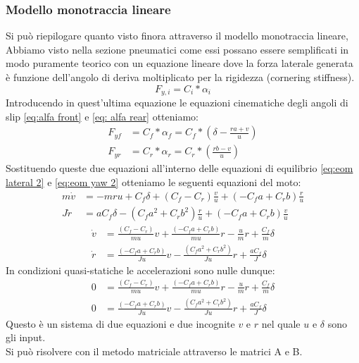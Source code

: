 \subsubsection{Modello monotraccia lineare}
Si può riepilogare quanto visto finora attraverso il modello monotraccia lineare, Abbiamo visto nella sezione pneumatici come essi possano essere semplificati in modo puramente teorico con un equazione lineare dove la forza laterale generata è funzione dell'angolo di deriva moltiplicato per la rigidezza (cornering stiffness).
\begin{equation}
    \label{eq:Fy=C*alfa}
    F_{y,i} = C_i*\alpha_i
\end{equation}
Introducendo in quest'ultima equazione le equazioni cinematiche degli angoli di slip \ref{eq:alfa front} e \ref{eq: alfa rear} otteniamo:\\
\begin{align}
F_{yf} & = C_f*\alpha_f = C_f*(\delta - \frac{ra+v}{u}) \\
F_{yr} & = C_r*\alpha_r = C_r*(\frac{rb-v}{u}) 
\end{align}
Sostituendo queste due equazioni all'interno delle equazioni di equilibrio \ref{eq:eom lateral 2} e \ref{eq:eom yaw 2} otteniamo le seguenti equazioni del moto:
\begin{align}
m\dot v & = -mru + C_f\delta  + ( C_f - C_r)\frac{v}{u} + (- C_fa + C_rb)\frac{r}{u}\label{eq:eom lateral linear}\\
J\dot r & = aC_f\delta - (C_f a^2 + C_r b^2)\frac{r}{u} + (- C_fa + C_rb)\frac{v}{u}\label{eq:eom yaw linear}
\end{align}
\begin{align}
\dot v & = \frac{( C_f - C_r)}{mu}v + \frac{(- C_fa + C_rb)}{mu}r - \frac{u}{m}r + \frac{C_f}{m}\delta\label{eq:eom lateral linear}\\
\dot r & = \frac{(- C_fa + C_rb)}{Ju}v - \frac{(C_f a^2 + C_r b^2)}{Ju}r + \frac{aC_f}{J}\delta \label{eq:eom yaw linear}
\end{align}
In condizioni quasi-statiche le accelerazioni sono nulle dunque:
\begin{align}
0 & = \frac{( C_f - C_r)}{mu}v + \frac{(- C_fa + C_rb)}{mu}r - \frac{u}{m}r + \frac{C_f}{m}\delta\label{eq:eom lateral linear}\\
0 & = \frac{(- C_fa + C_rb)}{Ju}v - \frac{(C_f a^2 + C_r b^2)}{Ju}r + \frac{aC_f}{J}\delta \label{eq:eom yaw linear}
\end{align}
Questo è un sistema di due equazioni e due incognite $v$ e $r$ nel quale $u$ e $\delta$ sono gli input.\\
Si può risolvere con il metodo matriciale attraverso le matrici A e B.




